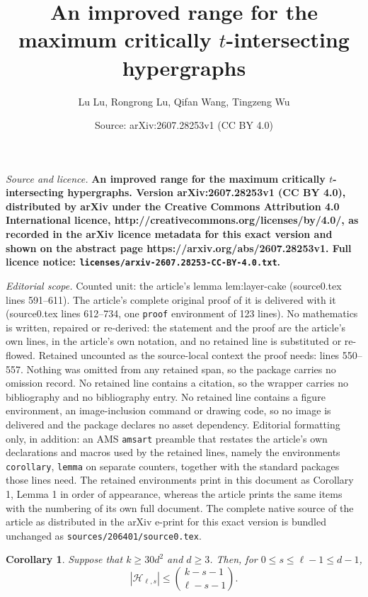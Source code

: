 \documentclass[10pt,a4paper]{amsart}
\title{\bf \Large An improved range for the maximum critically $t$-intersecting hypergraphs}
\author{Lu Lu, Rongrong Lu, Qifan Wang, Tingzeng Wu}
\date{Source: arXiv:2607.28253v1 (CC BY 4.0)}
\newtheorem{corollary}{Corollary}
\begin{document}
\maketitle

\noindent\emph{Source and licence.} \bf \Large An improved range for the maximum critically $t$-intersecting hypergraphs. Version arXiv:2607.28253v1 (CC BY 4.0), distributed by arXiv under the Creative Commons Attribution 4.0 International licence, http://creativecommons.org/licenses/by/4.0/, as recorded in the arXiv licence metadata for this exact version and shown on the abstract page https://arxiv.org/abs/2607.28253v1. Full licence notice: \texttt{licenses/arxiv-2607.28253-CC-BY-4.0.txt}.\par\smallskip

\noindent\textit{Editorial scope.} Counted unit: the article's lemma lem:layer-cake (source0.tex lines 591--611). The article's complete original proof of it is delivered with it (source0.tex lines 612--734, one \texttt{proof} environment of 123 lines). No mathematics is written, repaired or re-derived: the statement and the proof are the article's own lines, in the article's own notation, and no retained line is substituted or re-flowed.  Retained uncounted as the source-local context the proof needs: lines 550--557.  Nothing was omitted from any retained span, so the package carries no omission record.  No retained line contains a citation, so the wrapper carries no bibliography and no bibliography entry.  No retained line contains a figure environment, an image-inclusion command or drawing code, so no image is delivered and the package declares no asset dependency.  Editorial formatting only, in addition: an AMS \texttt{amsart} preamble that restates the article's own declarations and macros used by the retained lines, namely the environments \texttt{corollary}, \texttt{lemma} on separate counters, together with the standard packages those lines need.  The retained environments print in this document as Corollary 1, Lemma 1 in order of appearance, whereas the article prints the same items with the numbering of its own full document.  The complete native source of the article as distributed in the arXiv e-print for this exact version is bundled unchanged as \texttt{sources/206401/source0.tex}.
	\begin{corollary}\label{cor:H-bound}
		Suppose that $k\ge 30d^2$ and $d\ge 3$.  Then, for $0\le s\le \ell-1\le d-1$,
		\[
		|\mathcal H_{\ell,s}|
		\le
		\binom{k-s-1}{\ell-s-1}.
		\]
	\end{corollary}
\end{document}
